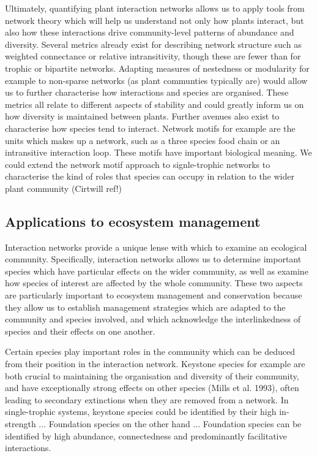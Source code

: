 \documentclass[a4,12pt]{article}
\begin{document}
        Ultimately, quantifying plant interaction networks allows us to apply tools from network theory which will help us understand not only how plants interact, but also how these interactions drive community-level patterns of abundance and diversity. Several metrics already exist for describing network structure such as weighted connectance or relative intransitivity, though these are fewer than for trophic or bipartite networks. Adapting measures of nestedness or modularity for example to non-sparse networks (as plant communties typically are) would allow us to further characterise how interactions and species are organised. These metrics all relate to different aspects of stability and could greatly inform us on how diversity is maintained between plants. 
        Further avenues also exist to characterise how species tend to interact. Network motifs for example are the units which makes up a network, such as a three species food chain or an intransitive interaction loop. These motifs have important biological meaning. We could extend the network motif approach to signle-trophic networks to characterise the kind of roles that species can occupy in relation to the wider plant community (Cirtwill ref!)



    \subsection{Applications to ecosystem management}

        Interaction networks provide a unique lense with which to examine an ecological community. Specifically, interaction networks allows us to determine important species which have particular effects on the wider community, as well as examine how species of interest are affected by the whole community. These two aspects are particularly important to ecosystem management and conservation because they allow us to establish management strategies which are adapted to the community and species involved, and which acknowledge the interlinkedness of species and their effects on one another. 

        Certain species play important roles in the community which can be deduced from their position in the interaction network. Keystone species for example are both crucial to maintaining the organisation and diversity of their community, and have exceptionally strong effects on other species (Mills et al. 1993), often leading to secondary extinctions when they are removed from a network. In single-trophic systems, keystone species could be identified by their high in-strength ... Foundation species on the other hand ... Foundation species can be identified by high abundance, connectedness and predominantly facilitative interactions.  
\end{document}

